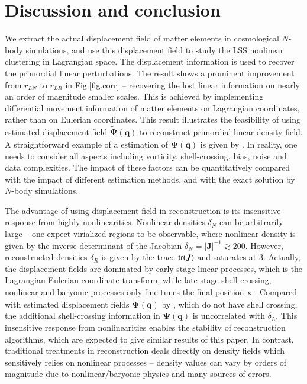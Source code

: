 \documentclass[aps,prd,twocolumn,superscriptaddress,amsfont,amssymb,amsmath,nofootinbib,showpacs,balancelastpage]{revtex4-1}
\newcommand{\bs}{\boldsymbol}
\newcommand{\tcr}{\textcolor{red}}
\begin{document}
\section{Discussion and conclusion}\label{sec.discussion}
We extract the actual displacement field of matter elements in cosmological $N$-body
simulations, and use this displacement field to study the LSS nonlinear
clustering in Lagrangian space. The displacement information is used to recover
the primordial linear perturbations. The result shows a prominent improvement from
$r_{LN}$ to $r_{LR}$ in Fig.\ref{fig.corr} -- recovering the lost linear information on
nearly an order of magnitude smaller scales.
This is achieved by implementing differential movement information
of matter elements on Lagrangian coordinates, rather than on
Eulerian coordinates. This result illustrates the feasibility
of using estimated displacement field $\tilde{\bs \Psi}(\bs q)$ to reconstruct primordial linear
density field. A straightforward example of a estimation of $\tilde{\bs \Psi}(\bs q)$
is given by \cite{1995ApJS..100..269P,1998ApJS..115...19P}.
In reality, one needs
to consider all aspects including vorticity, shell-crossing, bias, noise
and data complexities. The impact of these factors can be quantitatively
compared with the impact of different estimation methods, and with
the exact solution by $N$-body simulations.

The advantage of using displacement field in reconstruction is
its insensitive response from highly nonlinearities.
Nonlinear densities $\delta_N$ can be arbitrarily large -- 
one expect virialized regions to be observable, where nonlinear
density is given by the inverse determinant of the Jacobian
$\delta_N=|\bs J|^{-1}\gtrsim 200$.
However, reconstructed densities $\delta_R$ is given by
the trace $\rm{tr}(\bs J)$ and saturates at 3.
Actually, the displacement fields are dominated by early stage linear processes,
which is the Lagrangian-Eulerian coordinate transform,
while late stage shell-crossing, nonlinear and baryonic processes
only fine-tunes the final position $\bs x$
\citep{2014PhRvD..89h3515C}. Compared with estimated displacement fields $\tilde{\bs \Psi}(\bs q)$
by \cite{1995ApJS..100..269P}, which do not have shell crossing,
the additional shell-crossing information in $\bs\Psi(\bs q)$
is uncorrelated with $\delta_L$. This insensitive response from
nonlinearities enables the stability of reconstruction algorithms,
which are expected to give similar results of this paper. 
In contrast, traditional
treatments in reconstruction deals directly on density fields which sensitively
relies on nonlinear processes --  density values can vary by orders
of magnitude due to nonlinear/baryonic physics and many sources of errors.
\end{document}
